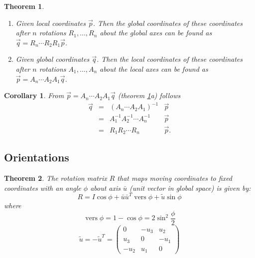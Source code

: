 \documentclass{article}
\newtheorem{theorem}{Theorem}[section]
\newtheorem{corollary}{Corollary}[section]
\theoremstyle{definition}
\DeclareMathOperator{\vers}{vers}
\begin{document}
\begin{theorem}\label{thm_succesive-rotation}\hfill
\begin{enumerate}[{(a)}]
\item Given local coordinates $\vec{p}$. Then the global coordinates of these coordinates after $n$ rotations $R_1, ..., R_n$ about the global axes can be found as $\vec{q} = R_n \cdots R_2 R_1 \vec{p}$.\newline
\item Given global coordinates $\vec{q}$. Then the local coordinates of these coordinates after $n$ rotations $A_1, ..., A_n$ about the local axes can be found as $\vec{p} = A_n \cdots A_2 A_1 \vec{q}$.\newline
\end{enumerate}
\end{theorem}

\begin{corollary}
From $\vec{p} = A_n \cdots A_2 A_1 \vec{q}$ (theorem \ref{thm_succesive-rotation}a) follows \newline
\begin{equation*}
\begin{array}{lcrl}
\vec{q} & = & \left( A_n \cdots A_2 A_1 \right)^{-1} & \vec{p} \\
& = & A_1^{-1} A_2^{-1} \cdots A_n^{-1} & \vec{p} \\
& = & R_1 R_2 \cdots R_n & \vec{p}.
\end{array}
\end{equation*}
\end{corollary}

\subsection{Orientations}
\begin{theorem}
The rotation matrix $R$ that maps moving coordinates to fixed coordinates with an angle $\phi$ about axis $\bar{u}$ (unit vector in global space) is given by:\newline
\begin{equation*}
R = I \cos \phi + \bar{u}\bar{u}^T \vers \phi + \tilde{u} \sin \phi
\end{equation*}
where
\begin{equation*}
\vers \phi = 1 - \cos \phi = 2 \sin^2 \frac{\phi}{2}
\end{equation*}
\begin{equation*}
\tilde{u} = -\tilde{u}^T = \begin{pmatrix}
0 & -u_3 & u_2 \\
u_3 & 0 & -u_1 \\
-u_2 & u_1 & 0
\end{pmatrix}
\end{equation*}
\end{theorem}
\end{document}
